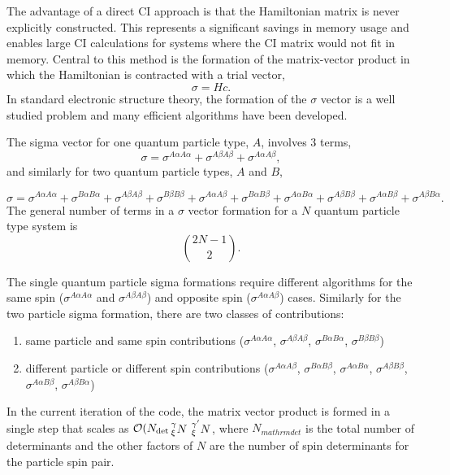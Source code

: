 The advantage of a direct CI approach is that the Hamiltonian matrix is never explicitly constructed.
This represents a significant savings in memory usage and enables large CI calculations for systems where the CI matrix would not fit in memory. Central to this method is the formation of the matrix-vector product in which the Hamiltonian is contracted with a trial vector,
\begin{equation}
    \sigma = H c.
\end{equation}
In standard electronic structure theory, the formation of the $\sigma$ vector is a well studied problem and many efficient algorithms have been developed.\citehere

The sigma vector for one quantum particle type, $A$, involves 3 terms,
\begin{equation}
    \sigma = 
    \sigma^{A \alpha A \alpha} +
    \sigma^{A \beta A \beta} +
    \sigma^{A \alpha A \beta},
\end{equation}
and similarly for two quantum particle types, $A$ and $B$, 

\begin{equation}
    \sigma = 
    \sigma^{A \alpha A \alpha} +
    \sigma^{B \alpha B \alpha} +
    \sigma^{A \beta A \beta} +
    \sigma^{B \beta B \beta} +
    \sigma^{A \alpha A \beta} +
    \sigma^{B \alpha B \beta} +
    \sigma^{A \alpha B \alpha} +
    \sigma^{A \beta B \beta} +
    \sigma^{A \alpha B \beta} +
    \sigma^{A \beta B \alpha}.
\end{equation}
The general number of terms in a $\sigma$ vector formation for a $N$ quantum particle type system is 
\begin{equation}
    \binom{2N -1}{2}.
\end{equation}

The single quantum particle sigma formations require different algorithms for the same spin ($\sigma^{A\alpha A\alpha}$ and $\sigma^{A\beta A\beta}$) and opposite spin ($\sigma^{A\alpha A\beta}$) cases.
Similarly for the two particle sigma formation, there are two classes of contributions:
\begin{enumerate}
    \item same particle and same spin contributions ($\sigma^{A\alpha A\alpha}$, $\sigma^{A\beta A\beta}$, $\sigma^{B\alpha B\alpha}$, $\sigma^{B\beta B\beta}$)
    \item different particle or different spin contributions ($\sigma^{A\alpha A\beta}$, $\sigma^{B\alpha B\beta}$, $\sigma^{A\alpha B\alpha}$, $\sigma^{A\beta B\beta}$, $\sigma^{A\alpha B\beta}$, $\sigma^{A\beta B\alpha}$)
\end{enumerate}
In the current iteration of the code, the matrix vector product is formed in a single step that scales as $\mathcal{O}(N_{\mathrm{det}}\sideset{^{\gamma}_{\xi}}{^{}_{}}{\mathop{N}} \sideset{^{\gamma'}_{\xi}}{^{}_{}}{\mathop{N}}$, where $N_{mathrm{det}}$ is the total number of determinants and the other factors of $N$ are the number of spin determinants for the particle spin pair.

